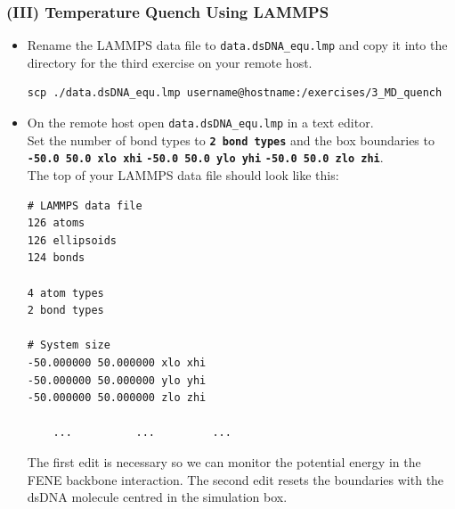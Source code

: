 \documentclass[slidestop,compress,9pt]{beamer}
\begin{document}
\begin{frame}[fragile]
\frametitle{(III) Temperature Quench Using LAMMPS}

\small

\begin{itemize}
\item Rename the LAMMPS data file to \texttt{data.dsDNA\_equ.lmp} and copy it into the directory for the third exercise on your remote host.

\begin{lstlisting}
scp ./data.dsDNA_equ.lmp username@hostname:/exercises/3_MD_quench
\end{lstlisting}

\item On the remote host open \texttt{data.dsDNA\_equ.lmp} in a text editor.\\
Set the number of bond types to \textbf{\texttt{2 bond types}} and the box boundaries to\\
\textbf{\texttt{-50.0 50.0 xlo xhi}} \textbf{\texttt{-50.0 50.0 ylo yhi}}
\textbf{\texttt{-50.0 50.0 zlo zhi}}.\\
The top of your LAMMPS data file should look like this:
\linespread{0.4}
\begin{lstlisting}
# LAMMPS data file
126 atoms
126 ellipsoids
124 bonds

4 atom types
2 bond types

# System size
-50.000000 50.000000 xlo xhi
-50.000000 50.000000 ylo yhi
-50.000000 50.000000 zlo zhi

    ...          ...         ... 
\end{lstlisting}
The first edit is necessary so we can monitor the potential energy in the FENE backbone interaction. The second edit resets the boundaries with the dsDNA molecule centred in the simulation box.

\end{itemize}

\end{frame}
\end{document}
